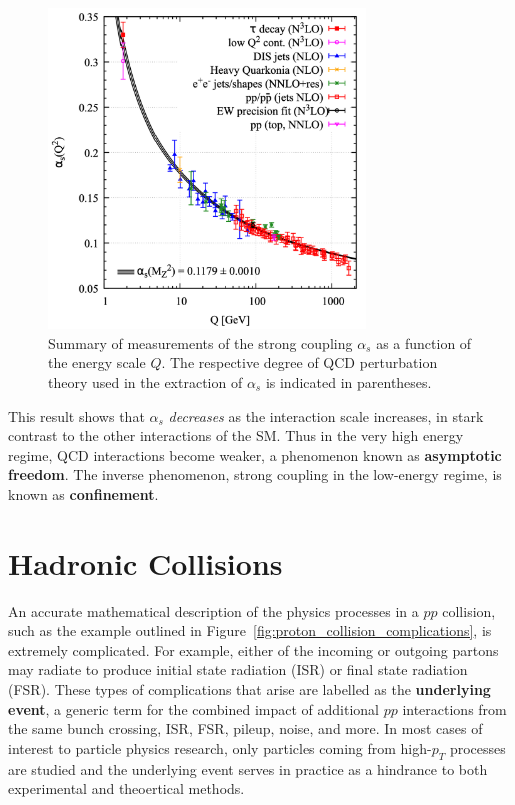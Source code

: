 \begin{figure}
	\centering
	\includegraphics[width=0.75\textwidth]{alpha_s_measurements}
	\caption{
	Summary of measurements of the strong coupling $\alpha_s$ as a function of the energy scale $Q$.
	The respective degree of QCD perturbation theory used in the extraction of $\alpha_s$ is indicated in parentheses.
	\cite{PDG:PhysRevD.98.030001}
	}
	\label{fig:alpha_s_measurements}
\end{figure}

This result shows that $\alpha_s$ \textit{decreases} as the interaction scale increases, in stark contrast to the other interactions of the SM.
Thus in the very high energy regime, QCD interactions become weaker, a phenomenon known as \textbf{asymptotic freedom}. %
The inverse phenomenon, strong coupling in the low-energy regime, is known as \textbf{confinement}.

\section{Hadronic Collisions}
An accurate mathematical description of the physics processes in a $pp$ collision, such as the example outlined in Figure~\ref{fig:proton_collision_complications}, is extremely complicated.
For example, either of the incoming or outgoing partons may radiate to produce initial state radiation (ISR) or final state radiation (FSR).
These types of complications that arise are labelled as the \textbf{underlying event}, a generic term for the combined impact of additional $pp$ interactions from the same bunch crossing, ISR, FSR, pileup, noise, and more.
In most cases of interest to particle physics research, only particles coming from high-$p_T$ processes are studied and the underlying event serves in practice as a hindrance to both experimental and theoertical methods.

